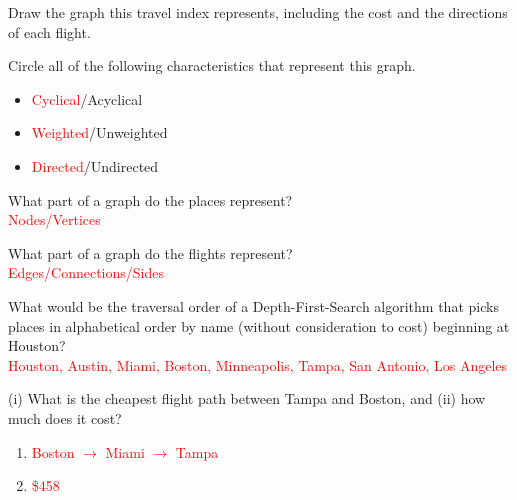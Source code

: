 \documentclass[11pt,addpoints]{exam}
\begin{document}
\begin{questions}
\begin{enumerate}[label=(\Alph*)]
  \begin{minipage}{\textwidth}
  \item Draw the graph this travel index represents, including the cost and the directions of each flight.
  
  \end{minipage}

  \item Circle all of the following characteristics that represent this graph.

  \begin{itemize}
    \item \textcolor{red}{Cyclical}/Acyclical
    \item \textcolor{red}{Weighted}/Unweighted
    \item \textcolor{red}{Directed}/Undirected \\
  \end{itemize}

  \item What part of a graph do the places represent? \\ 

  \textcolor{red}{Nodes/Vertices} \\

  \item What part of a graph do the flights represent?  \\

  \textcolor{red}{Edges/Connections/Sides} \\

  \item What would be the traversal order of a Depth-First-Search algorithm that picks places in alphabetical order by name (without consideration to cost) beginning at Houston? \\

  \textcolor{red}{Houston, Austin, Miami, Boston, Minneapolis, Tampa, San Antonio, Los Angeles} \\

  \item (i) What is the cheapest flight path between Tampa and Boston, and (ii) how much does it cost? \\

    \begin{enumerate}[label=(\alph*)]
      \item \textcolor{red}{Boston $\to$ Miami $\to$ Tampa}
      \item \textcolor{red}{\$458}
    \end{enumerate}
\end{enumerate}


\end{questions}
\end{document}
